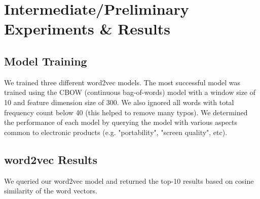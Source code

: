 \documentclass{article} %
\begin{document}
\section{Intermediate/Preliminary Experiments \& Results}
\subsection{Model Training} We trained three different word2vec models. The most successful model was trained using the CBOW (continuous bag-of-words) model with a window size of 10 and feature dimension size of 300. We also ignored all words with total frequency count below 40 (this helped to remove many typos). We determined the performance of each model by querying the model with various aspects common to electronic products (e.g. "portability", "screen quality", etc).

\subsection{word2vec Results}
We queried our word2vec model and returned the top-10 results based on cosine similarity of the word vectors.

%
%
\end{document}
